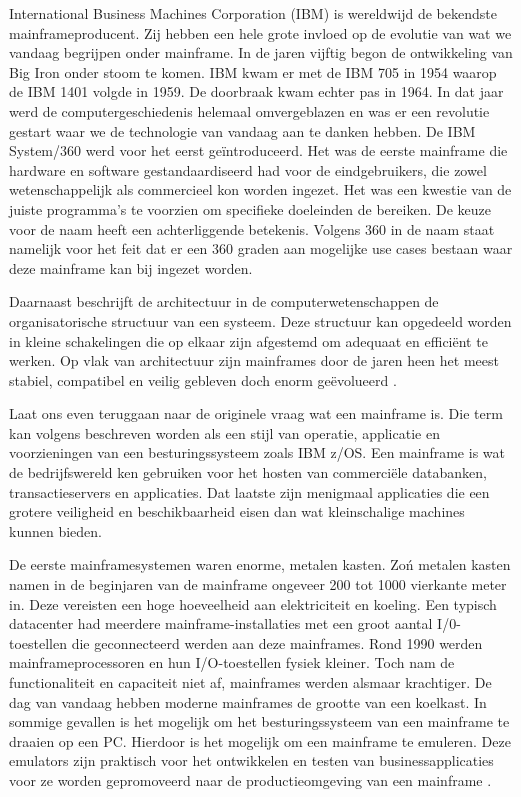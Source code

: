 International Business Machines Corporation (IBM) is wereldwijd de bekendste mainframeproducent. Zij hebben een hele grote invloed op de evolutie van wat we vandaag begrijpen onder mainframe. In de jaren vijftig begon de ontwikkeling van Big Iron onder stoom te komen. IBM kwam er met de IBM 705 in 1954 waarop de IBM 1401 volgde in 1959. De doorbraak kwam echter pas in 1964. In dat jaar werd de computergeschiedenis helemaal omvergeblazen en was er een revolutie gestart waar we de technologie van vandaag aan te danken hebben. De IBM System/360 werd voor het eerst geïntroduceerd. Het was de eerste mainframe die hardware en software gestandaardiseerd had voor de eindgebruikers, die zowel wetenschappelijk als commercieel kon worden ingezet. Het was een kwestie van de juiste programma's te voorzien om specifieke doeleinden de bereiken. De keuze voor de naam heeft een achterliggende betekenis. Volgens \textcite{Ebbers2022} 360 in de naam staat namelijk voor het feit dat er een 360 graden aan mogelijke use cases bestaan waar deze mainframe kan bij ingezet worden.

Daarnaast beschrijft de architectuur in de computerwetenschappen  de organisatorische structuur van een systeem. Deze structuur kan opgedeeld worden in kleine schakelingen die op elkaar zijn afgestemd om adequaat en efficiënt te werken. Op vlak van architectuur zijn mainframes door de jaren heen het meest stabiel, compatibel en veilig gebleven doch enorm geëvolueerd  \autocite{Ebbers2022}. 

Laat ons even teruggaan naar de originele vraag wat een mainframe is. Die term kan volgens \textcite{Ebbers2022}  beschreven worden als een stijl van operatie, applicatie en voorzieningen van een besturingssysteem zoals IBM z/OS. Een mainframe is wat de bedrijfswereld ken gebruiken voor het hosten van commerciële databanken, transactieservers en applicaties. Dat laatste zijn menigmaal applicaties die een grotere veiligheid en beschikbaarheid eisen dan wat kleinschalige machines kunnen bieden. 

De eerste mainframesystemen waren enorme, metalen kasten. Zo\'n metalen kasten namen in de beginjaren van de mainframe ongeveer 200 tot 1000 vierkante meter in. Deze vereisten een hoge hoeveelheid aan elektriciteit en koeling. Een typisch datacenter had meerdere mainframe-installaties met een groot aantal I/0-toestellen die geconnecteerd werden aan deze mainframes. Rond 1990 werden mainframeprocessoren en hun I/O-toestellen fysiek kleiner. Toch nam de functionaliteit en capaciteit niet af, mainframes werden alsmaar krachtiger. De dag van vandaag hebben moderne mainframes de grootte van een koelkast. In sommige gevallen is het mogelijk om het besturingssysteem van een mainframe te draaien op een PC. Hierdoor is het mogelijk om een mainframe te emuleren. Deze emulators zijn praktisch voor het ontwikkelen en testen van businessapplicaties voor ze worden gepromoveerd naar de productieomgeving van een mainframe  \autocite{Ebbers2022}. 

